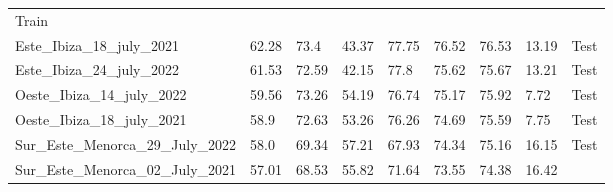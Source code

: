 \begin{table}[H]
{\begin{tabular}{lllllllll}
            {\color[HTML]{66c2a5} Train}
            \\
            Este\_Ibiza\_18\_july\_2021            & 62.28               & 73.4
                                                   & 43.37               &
            77.75
                                                   & 76.52               &
            76.53
                                                   & 13.19               &
            {\color[HTML]{fc8d62} Test}
            \\
            Este\_Ibiza\_24\_july\_2022            & 61.53               &
            72.59
                                                   & 42.15               & 77.8
                                                   & 75.62               &
            75.67
                                                   & 13.21               &
            {\color[HTML]{fc8d62} Test}
            \\
            Oeste\_Ibiza\_14\_july\_2022           & 59.56               &
            73.26
                                                   & 54.19               &
            76.74
                                                   & 75.17               &
            75.92
                                                   & 7.72                &
            {\color[HTML]{fc8d62} Test}
            \\
            Oeste\_Ibiza\_18\_july\_2021           & 58.9                &
            72.63
                                                   & 53.26               &
            76.26
                                                   & 74.69               &
            75.59
                                                   & 7.75                &
            {\color[HTML]{fc8d62} Test}
            \\
            Sur\_Este\_Menorca\_29\_July\_2022     & 58.0                &
            69.34
                                                   & 57.21               &
            67.93
                                                   & 74.34               &
            75.16
                                                   & 16.15               &
            {\color[HTML]{fc8d62} Test}
            \\
            Sur\_Este\_Menorca\_02\_July\_2021     & 57.01               &
            68.53
                                                   & 55.82               &
            71.64
                                                   & 73.55               &
            74.38
                                                   & 16.42               &

\end{tabular}}
\end{table}
